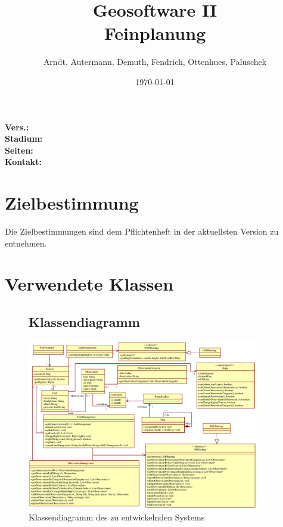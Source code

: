\documentclass[a4paper,11pt]{scrartcl}
\begin{document}
\title{Geosoftware II \\ \small Feinplanung}
\author{Arndt, Autermann, Demuth, Fendrich, Ottenhues, Paluschek}
\date{\today}
\maketitle
\thispagestyle{empty}

\begin{center}
\bf Vers.: \MyVersion \\
\bf Stadium: \MyStatus\\
\bf Seiten: \thelastpage \\
\bf Kontakt: \email \\
\end{center}
\newpage

\tableofcontents

\newpage

\section{Zielbestimmung}
	Die Zielbestimmungen sind dem Pflichtenheft in der aktuellsten Version zu entnehmen.\\

\section{Verwendete Klassen}

\begin{landscape}
\begin{figure}[htbp]
\subsection{Klassendiagramm}
		\centering
		\includegraphics[width=0.90\textwidth]{images/classes.eps}
		\caption{Klassendiagramm des zu entwickelnden Systems}
		\label{Klassendiagramm}

\end{figure}
\end{landscape}
\end{document}
